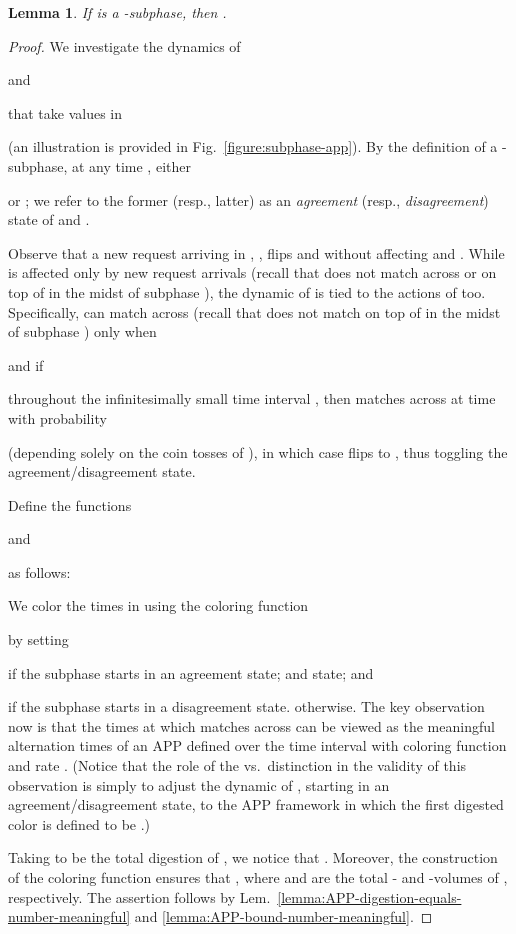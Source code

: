 \documentclass[11pt]{article}
\def\LongVersion{}
\def\LongVersionEnd{}
\def\ShortVersion{}
\def\ShortVersionEnd{}
\newtheorem{lemma}[theorem]{Lemma}
\theoremstyle{definition}
\theoremstyle{plain}
\newtheorem{lemma}[theorem]{Lemma}
\theoremstyle{definition}
\theoremstyle{plain}
\newtheorem{lemma}{Lemma}[section]
\theoremstyle{definition}
\theoremstyle{plain}
\newcommand{\Lem}{Lem.}
\newcommand{\Fig}{Fig.}
\begin{document}
\begin{lemma} \label{lemma:bound-time-cost-0-subphase}
If  is a -subphase, then
.
\end{lemma}
\ShortVersion \sloppy \ShortVersionEnd
\begin{proof}
We investigate the dynamics of

and

that take values in

(an illustration is provided in \Fig{}~\ref{figure:subphase-app}).
By the definition of a -subphase, at any time
,
either

or
;
we refer to the former (resp., latter) as an \emph{agreement} (resp.,
\emph{disagreement}) state of  and .

Observe that a new request arriving in , ,
flips  and  without affecting  and .
While  is affected only by new request arrivals
(recall that  does not match across or on top of  in the midst of
subphase ), the dynamic of  is tied to the actions of
 too.
Specifically,  can match across  (recall that  does not match on
top of  in the midst of subphase ) only when

and if 

throughout the infinitesimally small time interval
,
then  matches across  at time  with probability

(depending solely on the coin tosses of ), in which case 
flips to
,
thus toggling the agreement/disagreement state.

Define the functions

and

as follows:

We color the times in  using the coloring function

by setting

if the subphase starts in an agreement
\LongVersion state; and
\LongVersionEnd \ShortVersion state; and
\ShortVersionEnd 
\LongVersion if the subphase starts in a disagreement state.
\LongVersionEnd \ShortVersion otherwise.
\ShortVersionEnd The key observation now is that the times at which  matches across 
can be viewed as the meaningful alternation times of an APP 
defined over the time interval  with coloring function  and
rate .
(Notice that the role of the  vs.\ 
distinction in the validity of this observation is simply to adjust the
dynamic of , starting in an agreement/disagreement state, to
the APP framework in which the first digested color is defined to be .)

Taking  to be the total digestion of , we notice that
.
Moreover, the construction of the coloring function  ensures that
,
where  and  are the total - and -volumes of ,
respectively.
The assertion follows by \Lem{}\
\ref{lemma:APP-digestion-equals-number-meaningful} and
\ref{lemma:APP-bound-number-meaningful}.
\end{proof}
\ShortVersion \par\fussy \ShortVersionEnd
\end{document}

